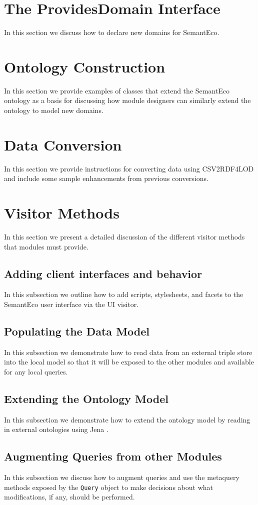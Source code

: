 \documentclass[letterpaper]{report}
\begin{document}
\section{The ProvidesDomain Interface}
In this section we discuss how to declare new domains for SemantEco.
\section{Ontology Construction}
In this section we provide examples of classes that extend the SemantEco ontology as a basis for discussing how module designers can similarly extend the ontology to model new domains.
\section{Data Conversion}
In this section we provide instructions for converting data using CSV2RDF4LOD \cite{lebo2011producing} and include some sample enhancements from previous conversions.
\section{Visitor Methods}
\label{visitors}
In this section we present a detailed discussion of the different visitor methods that modules must provide.
\subsection{Adding client interfaces and behavior}
In this subsection we outline how to add scripts, stylesheets, and facets to the SemantEco user interface via the UI visitor.
\subsection{Populating the Data Model}
In this subsection we demonstrate how to read data from an external triple store into the local model so that it will be exposed to the other modules and available for any local queries.
\subsection{Extending the Ontology Model}
In this subsection we demonstrate how to extend the ontology model by reading in external ontologies using Jena \cite{Jena}.
\subsection{Augmenting Queries from other Modules}
In this subsection we discuss how to augment queries and use the metaquery methods exposed by the \texttt{Query} object to make decisions about what modifications, if any, should be performed.
\end{document}
